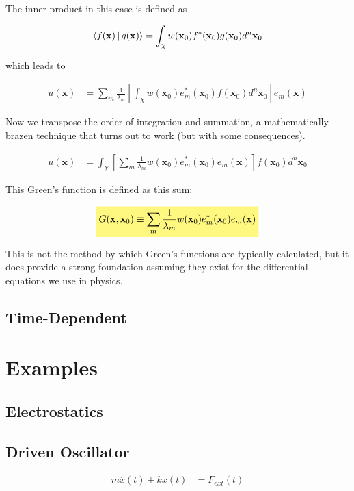 \documentclass[11pt]{article}
\theoremstyle{plain}
\theoremstyle{definition}
\renewcommand{\vec}[1]{\mathbf{#1}} %
\newcommand{\highlight}[1]{%
  \colorbox{yellow!50}{$\displaystyle#1$}}
\begin{document}
The inner product in this case is defined as

\begin{align}
    \Braket{f(\vec x)|g(\vec x)} = \int_{\chi} w(\vec x_0) f^*(\vec x_0) g(\vec x_0) d^n\vec x_0
\end{align}

which leads to

\begin{align}
    u(\vec x) &= \sum\limits_m \frac{1}{\lambda_m} \left[ \int_{\chi} w(\vec x_0) e_m^*(\vec x_0) f(\vec x_0) d^n\vec x_0 \right] e_m(\vec x)
\end{align}

Now we transpose the order of integration and summation, a mathematically brazen technique that turns out to work (but with some consequences).

\begin{align}
u(\vec x) &= \int_{\chi} \left[ \sum\limits_m \frac{1}{\lambda_m} w(\vec x_0) e_m^*(\vec x_0) e_m(\vec x) \right] f(\vec x_0) d^n\vec x_0
\end{align}

This Green's function is defined as this sum:

\begin{align}
    \highlight{G(\vec x,\vec x_0) \equiv \sum\limits_m \frac{1}{\lambda_m} w(\vec x_0) e_m^*(\vec x_0) e_m(\vec x)}
\end{align}

This is not the method by which Green's functions are typically calculated, but it does provide a strong foundation assuming they exist for the differential equations we use in physics.

\subsection{Time-Dependent}

\section{Examples}
\subsection{Electrostatics}
\subsection{Driven Oscillator}
\begin{align}
    m \ddot x(t) + kx(t) &= F_{ext}(t)
\end{align}
\end{document}
